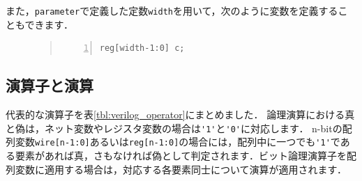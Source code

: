 \documentclass[a4paper,dvipdfmx]{jsarticle}
\begin{document}
また，\verb|parameter|で定義した定数\verb|width|を用いて，次のように変数を定義することもできます．
\begin{figure}[H]
\begin{quote}
\begin{Verbatim}[frame=single, numbers=left, baselinestretch=0.8]
reg[width-1:0] c;
\end{Verbatim}
\end{quote}
\end{figure}

\subsection{演算子と演算}
代表的な演算子を表\ref{tbl:verilog_operator}にまとめました．
論理演算における真と偽は，ネット変数やレジスタ変数の場合は\verb|'1'|と\verb|'0'|に対応します．
n-bitの配列変数\verb|wire[n-1:0]|あるいは\verb|reg[n-1:0]|の場合には，配列中に一つでも\verb|'1'|である要素があれば真，さもなければ偽として判定されます．ビット論理演算子を配列変数に適用する場合は，対応する各要素同士について演算が適用されます．
\end{document}
